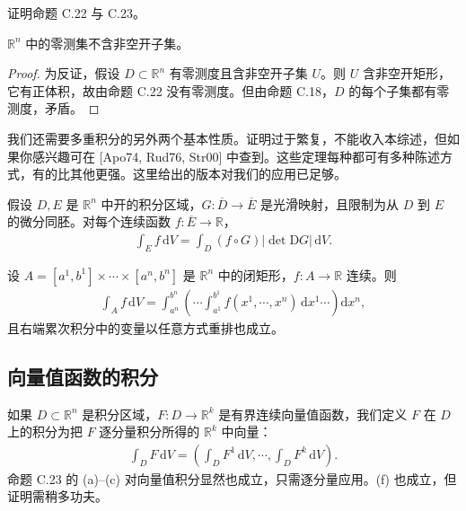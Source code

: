 \documentclass[../../main.tex]{subfiles}
\begin{document}
\begin{exercise}\label{exercise:appC-C-24}
证明命题 C.22 与 C.23。
\end{exercise}

\begin{corollary}\label{corollary:appC-no-open-null}
$\mathbb R^n$ 中的零测集不含非空开子集。
\end{corollary}

\begin{proof}
为反证，假设 $D\subset\mathbb R^n$ 有零测度且含非空开子集 $U$。则 $U$ 含非空开矩形，它有正体积，故由命题 C.22 没有零测度。但由命题 C.18，$D$ 的每个子集都有零测度，矛盾。
\end{proof}

我们还需要多重积分的另外两个基本性质。证明过于繁复，不能收入本综述，但如果你感兴趣可在 [Apo74, Rud76, Str00] 中查到。这些定理每种都可有多种陈述方式，有的比其他更强。这里给出的版本对我们的应用已足够。

\begin{theorem}[变量替换]\label{theorem:appC-change-of-variables}
假设 $D,E$ 是 $\mathbb R^n$ 中开的积分区域，$G:\overline D\to\overline E$ 是光滑映射，且限制为从 $D$ 到 $E$ 的微分同胚。对每个连续函数 $f:\overline E\to\mathbb R$，
\begin{align*}
\int_E f\,\mathrm{d}V=\int_D(f\circ G)|\det \mathrm{D}G|\,\mathrm{d}V.
\end{align*}
\end{theorem}

\begin{theorem}[Fubini 定理]\label{theorem:appC-fubini}
设 $A=[a^1,b^1]\times\cdots\times[a^n,b^n]$ 是 $\mathbb R^n$ 中的闭矩形，$f:A\to\mathbb R$ 连续。则
\begin{align*}
\int_A f\,\mathrm{d}V
=\int_{a^n}^{b^n}\left(\cdots\int_{a^1}^{b^1}f(x^1,\cdots ,x^n)\,\mathrm{d}x^1\cdots\right)\mathrm{d}x^n,
\end{align*}
且右端累次积分中的变量以任意方式重排也成立。
\end{theorem}

\subsection*{向量值函数的积分}

如果 $D\subset\mathbb R^n$ 是积分区域，$F:D\to\mathbb R^k$ 是有界连续向量值函数，我们定义 $F$ 在 $D$ 上的积分为把 $F$ 逐分量积分所得的 $\mathbb R^k$ 中向量：
\begin{align*}
\int_D F\,\mathrm{d}V=\left(\int_D F^1\,\mathrm{d}V,\cdots ,\int_D F^k\,\mathrm{d}V\right).
\end{align*}
命题 C.23 的 (a)--(c) 对向量值积分显然也成立，只需逐分量应用。(f) 也成立，但证明需稍多功夫。
\end{document}
